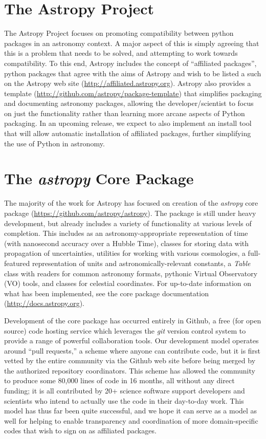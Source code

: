 \documentclass[11pt,twoside]{article}
\begin{document}
\section{The Astropy Project}
The Astropy Project focuses on promoting compatibility between python packages in an astronomy context.  A major aspect of this is simply agreeing that this is a problem that needs to be solved, and attempting to work towards compatibility.  To this end, Astropy includes the concept of ``affiliated packages'', python packages that agree with the aims of Astropy and wish to be listed a such on the Astropy web site (\url{http://affiliated.astropy.org}).  Astropy also provides a template (\url{http://github.com/astropy/package-template}) that simplifies packaging and documenting astronomy packages, allowing the developer/scientist to focus on just the functionality rather than learning more arcane aspects of Python packaging.  In an upcoming release, we expect to also implement an install tool that will allow automatic installation of affiliated packages, further simplifying the use of Python in astronomy.

\section{The {\it astropy} Core Package} 
The majority of the work for Astropy has focused on creation of the {\it astropy} core package (\url{https://github.com/astropy/astropy}).  The package is still under heavy development, but already includes a variety of functionality at various levels of completion.  This includes as an astronomy-appropriate representation of time (with nanosecond accuracy over a Hubble Time), classes for storing data with propagation of uncertainties, utilities for working with various cosmologies, a full-featured representation of units and astronomically-relevant constants, a {\it Table} class with readers for common astronomy formats, pythonic Virtual Observatory (VO) tools, and classes for celestial coordinates.  For up-to-date information on what has been implemented, see the core package documentation (\url{http://docs.astropy.org}).

Development of the core package has occurred entirely in Github, a free (for open source) code hosting service which leverages the {\it git} version control system to provide a range of powerful collaboration tools.  Our development model operates around ``pull requests,'' a scheme where anyone can contribute code, but it is first vetted by the entire community via the Github web site before being merged by the authorized repository coordinators. This scheme has allowed the community to produce some 80,000 lines of code in 16 months, all without any direct funding; it is all contributed by 20+  science software support developers and scientists who intend to actually use the code in their day-to-day work.  This model has thus far been quite successful, and we hope it can serve as a model as well for helping to enable transparency and coordination of more domain-specific codes that wish to sign on as affiliated packages.
\end{document}
